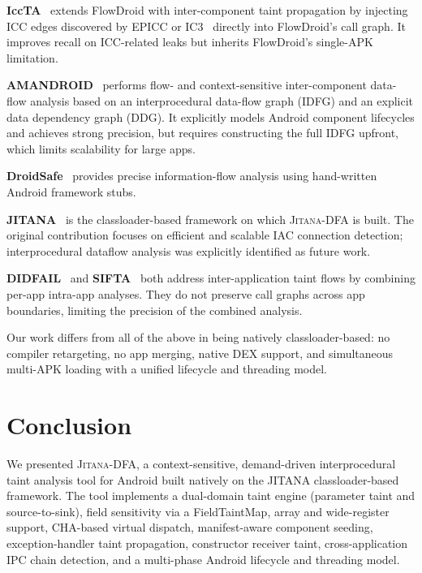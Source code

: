 \documentclass[conference]{IEEEtran}
\begin{document}
\textbf{IccTA}~\cite{iccta} extends FlowDroid with inter-component taint
propagation by injecting ICC edges discovered by EPICC or IC3~\cite{ic3} directly
into FlowDroid's call graph. It improves recall on ICC-related leaks but inherits
FlowDroid's single-APK limitation.

\textbf{AMANDROID}~\cite{amandroid} performs flow- and context-sensitive
inter-component data-flow analysis based on an interprocedural data-flow graph
(IDFG) and an explicit data dependency graph (DDG). It explicitly models Android
component lifecycles and achieves strong precision, but requires constructing the
full IDFG upfront, which limits scalability for large apps.

\textbf{DroidSafe}~\cite{droidsafe} provides precise information-flow analysis
using hand-written Android framework stubs.

\textbf{JITANA}~\cite{jitana} is the classloader-based framework on which
\textsc{Jitana-DFA} is built. The original contribution focuses on efficient and
scalable IAC connection detection; interprocedural dataflow analysis was
explicitly identified as future work.

\textbf{DIDFAIL}~\cite{didfail} and \textbf{SIFTA}~\cite{sifta} both address
inter-application taint flows by combining per-app intra-app analyses. They do
not preserve call graphs across app boundaries, limiting the precision of the
combined analysis.

Our work differs from all of the above in being natively classloader-based: no
compiler retargeting, no app merging, native DEX support, and simultaneous
multi-APK loading with a unified lifecycle and threading model.

\section{Conclusion}

We presented \textsc{Jitana-DFA}, a context-sensitive, demand-driven
interprocedural taint analysis tool for Android built natively on the JITANA
classloader-based framework. The tool implements a dual-domain taint engine
(parameter taint and source-to-sink), field sensitivity via a FieldTaintMap,
array and wide-register support, CHA-based virtual dispatch, manifest-aware
component seeding, exception-handler taint propagation, constructor receiver
taint, cross-application IPC chain detection, and a multi-phase Android lifecycle
and threading model.
\end{document}
